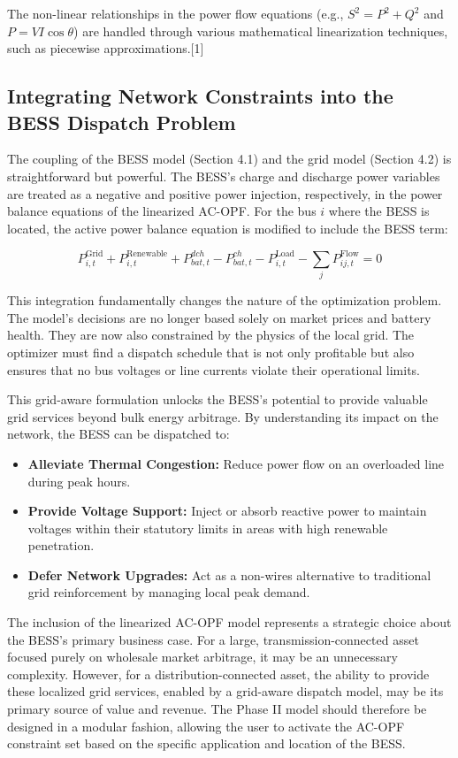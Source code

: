 The non-linear relationships in the power flow equations (e.g., $S^2 = P^2 + Q^2$ and $P = VI\cos\theta$) are handled through various mathematical linearization techniques, such as piecewise approximations.[1]

\subsection{Integrating Network Constraints into the BESS Dispatch Problem}

The coupling of the BESS model (Section 4.1) and the grid model (Section 4.2) is straightforward but powerful. The BESS's charge and discharge power variables are treated as a negative and positive power injection, respectively, in the power balance equations of the linearized AC-OPF. For the bus $i$ where the BESS is located, the active power balance equation is modified to include the BESS term:

\begin{equation}
P_{i,t}^{\text{Grid}} + P_{i,t}^{\text{Renewable}} + P_{bat,t}^{dch} - P_{bat,t}^{ch} - P_{i,t}^{\text{Load}} - \sum_{j} P_{ij,t}^{\text{Flow}} = 0
\end{equation}

This integration fundamentally changes the nature of the optimization problem. The model's decisions are no longer based solely on market prices and battery health. They are now also constrained by the physics of the local grid. The optimizer must find a dispatch schedule that is not only profitable but also ensures that no bus voltages or line currents violate their operational limits.

This grid-aware formulation unlocks the BESS's potential to provide valuable grid services beyond bulk energy arbitrage. By understanding its impact on the network, the BESS can be dispatched to:
\begin{itemize}
    \item \textbf{Alleviate Thermal Congestion:} Reduce power flow on an overloaded line during peak hours.
    \item \textbf{Provide Voltage Support:} Inject or absorb reactive power to maintain voltages within their statutory limits in areas with high renewable penetration.
    \item \textbf{Defer Network Upgrades:} Act as a non-wires alternative to traditional grid reinforcement by managing local peak demand.
\end{itemize}

The inclusion of the linearized AC-OPF model represents a strategic choice about the BESS's primary business case. For a large, transmission-connected asset focused purely on wholesale market arbitrage, it may be an unnecessary complexity. However, for a distribution-connected asset, the ability to provide these localized grid services, enabled by a grid-aware dispatch model, may be its primary source of value and revenue. The Phase II model should therefore be designed in a modular fashion, allowing the user to activate the AC-OPF constraint set based on the specific application and location of the BESS.

